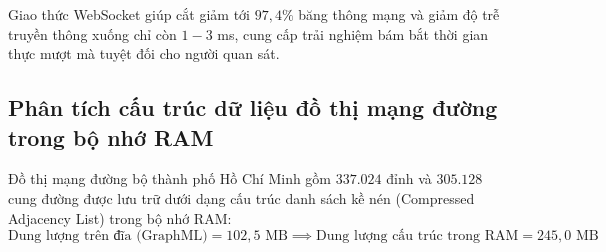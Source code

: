 \begin{table}[H]
\centering
\caption{Đo đạc đối chiếu hiệu năng mạng giữa ba giao thức truyền thông thời gian thực ở nhịp 10 Hz}
\label{tab:network-protocols-benchmark}
\end{table}

Giao thức WebSocket giúp cắt giảm tới $97{,}4\%$ băng thông mạng và giảm độ trễ truyền thông xuống chỉ còn $1 - 3$ ms, cung cấp trải nghiệm bám bắt thời gian thực mượt mà tuyệt đối cho người quan sát.

\subsection{Phân tích cấu trúc dữ liệu đồ thị mạng đường trong bộ nhớ RAM}

\hspace{0.5cm} Đồ thị mạng đường bộ thành phố Hồ Chí Minh gồm $337.024$ đỉnh và $305.128$ cung đường được lưu trữ dưới dạng cấu trúc danh sách kề nén (Compressed Adjacency List) trong bộ nhớ RAM:
\begin{equation}
\text{Dung lượng trên đĩa (GraphML)} = 102{,}5\text{ MB} \implies \text{Dung lượng cấu trúc trong RAM} = 245{,}0\text{ MB}
\label{eq:graph-memory-expansion}
\end{equation}

